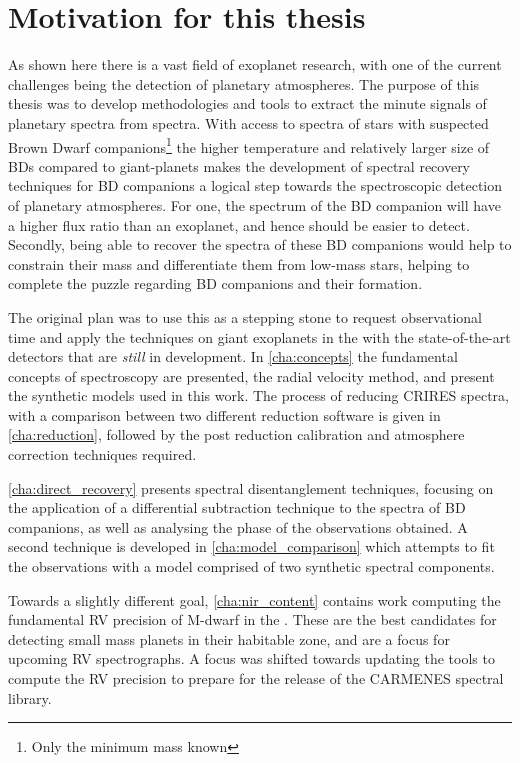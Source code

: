 \section{Motivation for this thesis}
\label{sec:thesis_motivation}

As shown here there is a vast field of exoplanet research, with one of the current challenges being the detection of planetary atmospheres.
The purpose of this thesis was to develop methodologies and tools to extract the minute signals of planetary spectra from \nir{} spectra.
With access to \nir{} spectra of stars with suspected Brown Dwarf companions\footnote{Only the minimum mass \mtwosini known} the higher temperature and relatively larger size of BDs compared to giant-planets makes the development of spectral recovery techniques for BD companions a logical step towards the spectroscopic detection of planetary atmospheres.
For one, the spectrum of the BD companion will have a higher flux ratio than an exoplanet, and hence should be easier to detect. Secondly, being able to recover the spectra of these BD companions would help to constrain their mass and differentiate them from low-mass stars, helping to complete the puzzle regarding BD companions and their formation.

The original plan was to use this as a stepping stone to request observational time and apply the techniques on giant exoplanets in the \nir{} with the state-of-the-art detectors that are \emph{still} in development.
In \cref{cha:concepts} the fundamental concepts of \nir{} spectroscopy are presented, the radial velocity method, and present the synthetic models used in this work.
The process of reducing \nir{} CRIRES spectra, with a comparison between two different reduction software is given in \cref{cha:reduction}, followed by the post reduction calibration and atmosphere correction techniques required.

\cref{cha:direct_recovery} presents spectral disentanglement techniques, focusing on the application of a differential subtraction technique to the \nir{} spectra of BD companions, as well as analysing the phase of the observations obtained. A second technique is developed in \cref{cha:model_comparison} which attempts to fit the observations with a model comprised of two synthetic spectral components.

Towards a slightly different goal, \cref{cha:nir_content} contains work computing the fundamental RV precision of {M-dwarf} in the \nir{}.
These are the best candidates for detecting small mass planets in their habitable zone, and are a focus for upcoming \nir{} RV spectrographs.
A focus was shifted towards updating the tools to compute the RV precision to prepare for the release of the CARMENES \nir{} spectral library.

